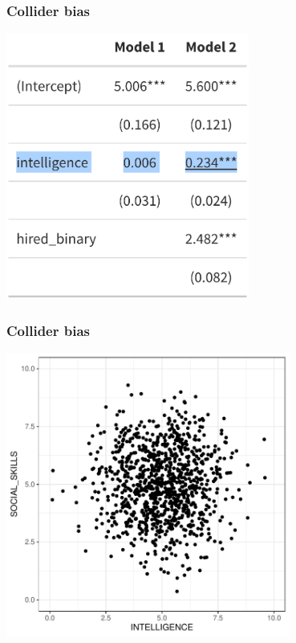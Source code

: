 \documentclass[aspectratio=43]{beamer}
\begin{document}
\begin{frame}
\frametitle{Collider bias}
\centering

\includegraphics[width = 0.6\textwidth]{../img/collider_m2}


\end{frame}

\begin{frame}
\frametitle{Collider bias}
\centering

\includegraphics[width = 0.7\textwidth]{../img/collider1}

\end{frame}
\end{document}
